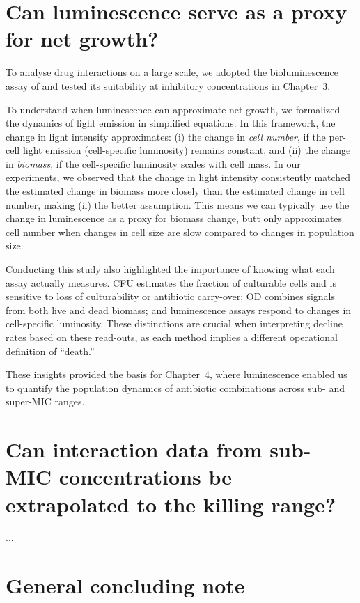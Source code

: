 \documentclass[../main.tex]{subfiles}
\begin{document}
\section{Can luminescence serve as a proxy for net growth?}

To analyse drug interactions on a large scale, we adopted the bioluminescence assay of \cite{Kishony2003} and tested its suitability at inhibitory concentrations in Chapter~3.

To understand when luminescence can approximate net growth, we formalized the dynamics of light emission in simplified equations. In this framework, the change in light intensity approximates:
(i) the change in \emph{cell number}, if the per-cell light emission (cell-specific luminosity) remains constant, and
(ii) the change in \emph{biomass}, if the cell-specific luminosity scales with cell mass.
In our experiments, we observed that the change in light intensity consistently matched the estimated change in biomass more closely than the estimated change in cell number, making (ii) the better assumption.
This means we can typically use the change in luminescence as a proxy for biomass change, butt only approximates cell number when changes in cell size are slow compared to changes in population size.

Conducting this study also highlighted the importance of knowing what each assay actually measures. CFU estimates the fraction of culturable cells and is sensitive to loss of culturability or antibiotic carry-over; OD combines signals from both live and dead biomass; and luminescence assays respond to changes in cell-specific luminosity. These distinctions are crucial when interpreting decline rates based on these read-outs, as each method implies a different operational definition of ``death.''

These insights provided the basis for Chapter~4, where luminescence enabled us to quantify the population dynamics of antibiotic combinations across sub- and super-MIC ranges.

\section{Can interaction data from sub-MIC concentrations be extrapolated to the killing range?}
...

\section{General concluding note}
\end{document}
